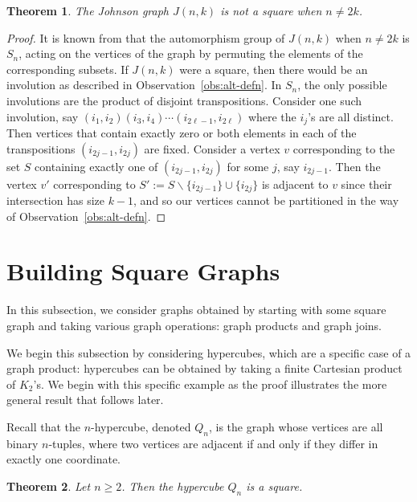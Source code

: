 \documentclass{article}
\newtheorem{theorem}{Theorem}[section]
\theoremstyle{definition}
\begin{document}
\begin{theorem}
The Johnson graph $J(n,k)$ is not a square when $n\neq 2k$.
\end{theorem}

\begin{proof}
    It is known from \cite{BCN89} that the automorphism group of $J(n,k)$ when $n \neq 2k$ is $S_n$, acting on the vertices of the graph by permuting the elements of the corresponding subsets. If $J(n,k)$ were a square, then there would be an involution as described in Observation~\ref{obs:alt-defn}. In $S_n$, the only possible involutions are the product of disjoint transpositions. Consider one such involution, say $(i_1,i_2)(i_3,i_4)\cdots(i_{2\ell-1},i_{2\ell})$ where the $i_j$'s are all distinct. Then vertices that contain exactly zero or both elements in each of the transpositions $(i_{2j-1},i_{2j})$ are fixed. Consider a vertex $v$ corresponding to the set $S$ containing exactly one of $(i_{2j-1},i_{2j})$ for some $j$, say $i_{2j-1}$. Then the vertex $v'$ corresponding to $S':=S\backslash \{i_{2j-1}\} \cup \{i_{2j}\}$ is adjacent to $v$ since their intersection has size $k-1$, and so our vertices cannot be partitioned in the way of Observation~\ref{obs:alt-defn}.
\end{proof}

\section{Building Square Graphs} \label{sec:build-graphs}

In this subsection, we consider graphs obtained by starting with some square graph and taking various graph operations: graph products and graph joins.

We begin this subsection by considering hypercubes, which are a specific case of a graph product: hypercubes can be obtained by taking a finite Cartesian product of $K_2$'s. We begin with this specific example as the proof illustrates the more general result that follows later. 

Recall that the $n$-hypercube, denoted $Q_n$, is the graph whose vertices are all binary $n$-tuples, where two vertices are adjacent if and only if they differ in exactly one coordinate.


\begin{theorem} \label{thm:hypercube}
Let $n\geq 2$. Then the hypercube $Q_n$ is a square. 
\end{theorem}
\end{document}
